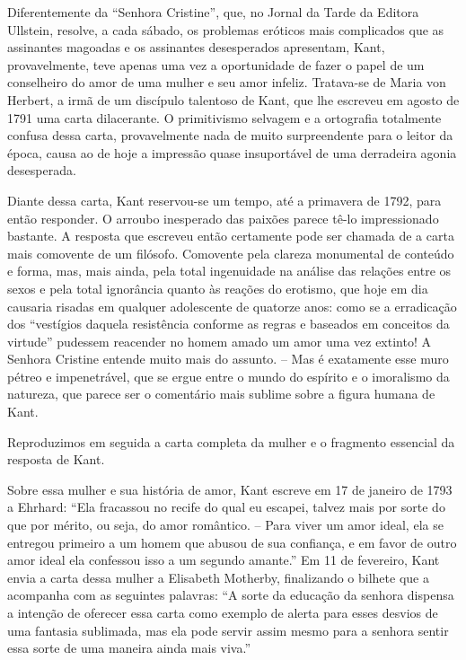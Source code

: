 Diferentemente da ``Senhora Cristine'', que, no Jornal da Tarde da
Editora Ullstein, resolve, a cada sábado, os problemas eróticos mais
complicados que as assinantes magoadas e os assinantes desesperados
apresentam, Kant, provavelmente, teve apenas uma vez a oportunidade de
fazer o papel de um conselheiro do amor de uma mulher e seu amor
infeliz. Tratava-se de Maria von Herbert, a irmã de um discípulo
talentoso de Kant, que lhe escreveu em agosto de 1791 uma carta
dilacerante. O primitivismo selvagem e a ortografia totalmente confusa
dessa carta, provavelmente nada de muito surpreendente para o leitor da
época, causa ao de hoje a impressão quase insuportável de uma derradeira
agonia desesperada.

Diante dessa carta, Kant reservou-se um tempo, até a primavera de 1792,
para então responder. O arroubo inesperado das paixões parece tê-lo
impressionado bastante. A resposta que escreveu então certamente pode
ser chamada de a carta mais comovente de um filósofo. Comovente pela
clareza monumental de conteúdo e forma, mas, mais ainda, pela total
ingenuidade na análise das relações entre os sexos e pela total
ignorância quanto às reações do erotismo, que hoje em dia causaria
risadas em qualquer adolescente de quatorze anos: como se a erradicação
dos ``vestígios daquela resistência conforme as regras e baseados em
conceitos da virtude'' pudessem reacender no homem amado um amor uma vez
extinto! A Senhora Cristine entende muito mais do assunto. -- Mas é
exatamente esse muro pétreo e impenetrável, que se ergue entre o mundo
do espírito e o imoralismo da natureza, que parece ser o comentário mais
sublime sobre a figura humana de Kant.

Reproduzimos em seguida a carta completa da mulher e o fragmento
essencial da resposta de Kant.

Sobre essa mulher e sua história de amor, Kant escreve em 17 de janeiro
de 1793 a Ehrhard: ``Ela fracassou no recife do qual eu escapei, talvez
mais por sorte do que por mérito, ou seja, do amor romântico. -- Para
viver um amor ideal, ela se entregou primeiro a um homem que abusou de
sua confiança, e em favor de outro amor ideal ela confessou isso a um
segundo amante.'' Em 11 de fevereiro, Kant envia a carta dessa mulher a
Elisabeth Motherby, finalizando o bilhete que a acompanha com as
seguintes palavras: ``A sorte da educação da senhora dispensa a intenção
de oferecer essa carta como exemplo de alerta para esses desvios de uma
fantasia sublimada, mas ela pode servir assim mesmo para a senhora
sentir essa sorte de uma maneira ainda mais viva.''

